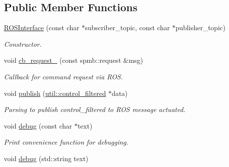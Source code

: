 \subsection*{Public Member Functions}
\begin{DoxyCompactItemize}
\item 
\hyperlink{classSPMB_1_1ROSInterface_a35478a3b15d22289c6820e70e5cec671}{R\+O\+S\+Interface} (const char $\ast$subscriber\+\_\+topic, const char $\ast$publisher\+\_\+topic)\hypertarget{classSPMB_1_1ROSInterface_a35478a3b15d22289c6820e70e5cec671}{}\label{classSPMB_1_1ROSInterface_a35478a3b15d22289c6820e70e5cec671}

\begin{DoxyCompactList}\small\item\em Constructor. \end{DoxyCompactList}\item 
void \hyperlink{classSPMB_1_1ROSInterface_ad2d544970c191068cbe030d99763d42c}{cb\+\_\+request\+\_\+} (const spmb\+::request \&msg)\hypertarget{classSPMB_1_1ROSInterface_ad2d544970c191068cbe030d99763d42c}{}\label{classSPMB_1_1ROSInterface_ad2d544970c191068cbe030d99763d42c}

\begin{DoxyCompactList}\small\item\em Callback for command request via R\+OS. \end{DoxyCompactList}\item 
void \hyperlink{classSPMB_1_1ROSInterface_abb8a72d72e30a8475793200c730e26e6}{publish} (\hyperlink{structSPMB_1_1util_1_1control__filtered}{util\+::control\+\_\+filtered} $\ast$data)\hypertarget{classSPMB_1_1ROSInterface_abb8a72d72e30a8475793200c730e26e6}{}\label{classSPMB_1_1ROSInterface_abb8a72d72e30a8475793200c730e26e6}

\begin{DoxyCompactList}\small\item\em Parsing to publish control\+\_\+filtered to R\+OS message actuated. \end{DoxyCompactList}\item 
void \hyperlink{classSPMB_1_1ROSInterface_a6e220ac2a41d61b6185190cc372b1e42}{debug} (const char $\ast$text)\hypertarget{classSPMB_1_1ROSInterface_a6e220ac2a41d61b6185190cc372b1e42}{}\label{classSPMB_1_1ROSInterface_a6e220ac2a41d61b6185190cc372b1e42}

\begin{DoxyCompactList}\small\item\em Print convenience function for debugging. \end{DoxyCompactList}\item 
void \hyperlink{classSPMB_1_1ROSInterface_a7b11f07c071a4d15020c35ba5b08c62f}{debug} (std\+::string text)\hypertarget{classSPMB_1_1ROSInterface_a7b11f07c071a4d15020c35ba5b08c62f}{}\label{classSPMB_1_1ROSInterface_a7b11f07c071a4d15020c35ba5b08c62f}


\end{DoxyCompactItemize}
